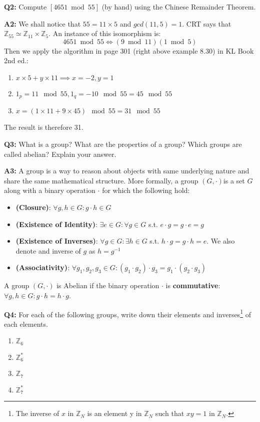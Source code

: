 \documentclass[12pt,reqno]{amsart}
\begin{document}
\vspace{20px}
\textbf{Q2:} Compute $[4651 \bmod 55]$ (by hand) using the Chinese Remainder Theorem.

\textbf{A2:} We shall notice that $55 = 11 \times 5$ and $gcd(11,5)=1$. CRT says that $\mathbb{Z}_{55} \simeq \mathbb{Z}_{11} \times \mathbb{Z}_{5}$. An instance of this isomorphism is:
$$
4651 \bmod 55 \iff (9 \bmod 11)(1 \bmod 5)
$$
Then we apply the algorithm in page 301 (right above example 8.30) in KL Book 2nd ed.:
\begin{enumerate}
	\item $x\times5 + y\times 11 \implies x = -2, y = 1$
	\item $ 1_p = 11 \mod 55, 1_q = -10 \mod 55 = 45 \mod 55$
	\item $x = (1 \times 11 + 9 \times 45) \mod 55 = 31 \mod 55$
\end{enumerate}
The result is therefore 31.

\vspace{20px}
\textbf{Q3:} What is a group? What are the properties of a group? Which groups are called abelian? Explain your answer.

\textbf{A3:} A group is a way to reason about objects with same underlying nature and share the same mathematical structure. More formally, a group $(G, \cdot)$is a set $G$ along with a binary operation $\cdot$ for which the following hold:
\begin{itemize}
 \item \textbf{(Closure)}: $\forall g, h \in G : g \cdot h \in G$
 \item \textbf{(Existence of Identity)}: $\exists e \in G : \forall g \in G$ s.t. $e \cdot g = g \cdot e = g$
 \item \textbf{(Existence of Inverses)}: $\forall g \in G : \exists h \in G$ s.t. $h \cdot g = g \cdot h = e$. We also denote and inverse of $g$ as $h = g^{-1}$
 \item \textbf{(Associativity)}: $\forall g_1, g_2, g_3 \in G : (g_1 \cdot g_2) \cdot g_3 = g_1 \cdot (g_2 \cdot g_3)$
\end{itemize}
A group $(G, \cdot)$ is Abelian if the binary operation $\cdot$ is \textbf{commutative}: $\forall g, h \in G : g \cdot h = h \cdot g$.

\vspace{20px}
\textbf{Q4:} For each of the following groups, write down their elements and inverses\footnote{The inverse of $x$ in $\mathbb{Z}_N$ is an element y in $\mathbb{Z}_N$ such that $xy = 1$ in $\mathbb{Z}_N$.} of each elements.
\begin{enumerate}[label=\alph*.]
 \item $\mathbb{Z}_6$
 \item $\mathbb{Z}_6^*$
 \item $\mathbb{Z}_7$
 \item $\mathbb{Z}_7^*$
\end{enumerate}
\end{document}
